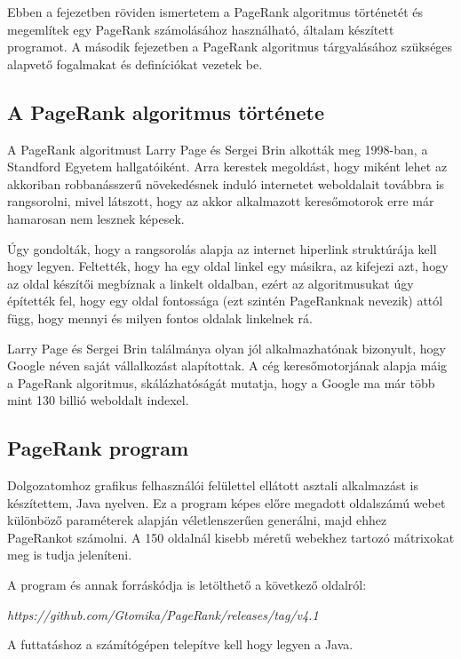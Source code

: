 \documentclass[12pt,a4paper]{article}
\begin{document}
Ebben a fejezetben röviden ismertetem a PageRank algoritmus történetét és megemlítek egy PageRank számolásához használható, általam készített programot. A második fejezetben a PageRank algoritmus tárgyalásához szükséges alapvető fogalmakat és definíciókat vezetek be. 

\subsection{A PageRank algoritmus története}

A PageRank algoritmust Larry Page és Sergei Brin alkották meg 1998-ban, a Standford Egyetem hallgatóiként. Arra kerestek megoldást, hogy miként lehet az akkoriban robbanásszerű növekedésnek induló internetet weboldalait továbbra is rangsorolni, mivel látszott, hogy az akkor alkalmazott keresőmotorok erre már hamarosan nem lesznek képesek.

Úgy gondolták, hogy a rangsorolás alapja az internet hiperlink struktúrája kell hogy legyen. Feltették, hogy ha egy oldal linkel egy másikra, az kifejezi azt, hogy az oldal készítői megbíznak a linkelt oldalban, ezért az algoritmusukat úgy építették fel, hogy egy oldal fontossága (ezt szintén PageRanknak nevezik) attól függ, hogy mennyi és milyen fontos oldalak linkelnek rá.

Larry Page és Sergei Brin találmánya olyan jól alkalmazhatónak bizonyult, hogy Google néven saját vállalkozást alapítottak. A cég keresőmotorjának alapja máig a PageRank algoritmus, skálázhatóságát mutatja, hogy a Google ma már több mint 130 billió weboldalt indexel. 

\subsection{PageRank program}

Dolgozatomhoz grafikus felhasználói felülettel ellátott asztali alkalmazást is készítettem, Java nyelven. Ez a program képes előre megadott oldalszámú webet különböző paraméterek alapján véletlenszerűen generálni, majd ehhez PageRankot számolni. A 150 oldalnál kisebb méretű webekhez tartozó mátrixokat meg is tudja jeleníteni.

A program és annak forráskódja is letölthető a következő oldalról:

\vspace{0.3 cm}
\textit{https://github.com/Gtomika/PageRank/releases/tag/v4.1}
\vspace{0.3 cm}

 A futtatáshoz a számítógépen telepítve kell hogy legyen a Java.
\end{document}
